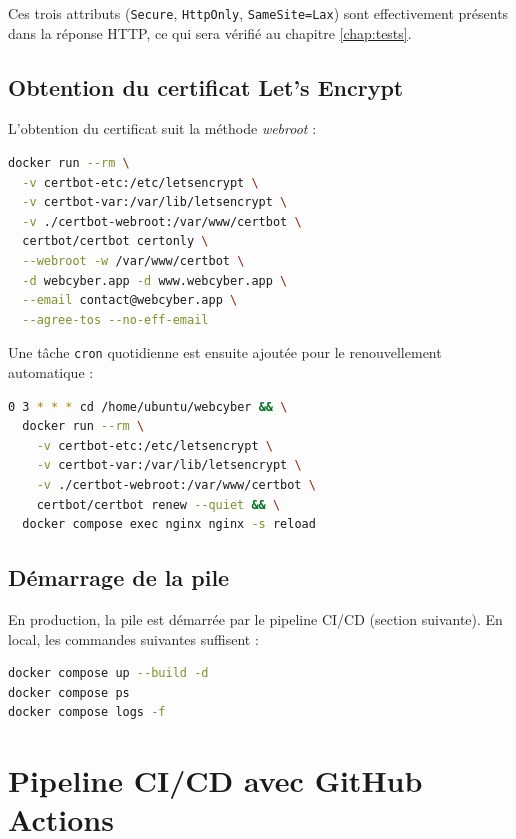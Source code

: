 Ces trois attributs (\texttt{Secure}, \texttt{HttpOnly},
\texttt{SameSite=Lax}) sont effectivement présents dans la réponse
HTTP, ce qui sera vérifié au chapitre \ref{chap:tests}.

\subsection{Obtention du certificat Let's Encrypt}

L'obtention du certificat suit la méthode \emph{webroot} :

\begin{lstlisting}[language=bash, caption={Première émission du certificat via Certbot.}]
docker run --rm \
  -v certbot-etc:/etc/letsencrypt \
  -v certbot-var:/var/lib/letsencrypt \
  -v ./certbot-webroot:/var/www/certbot \
  certbot/certbot certonly \
  --webroot -w /var/www/certbot \
  -d webcyber.app -d www.webcyber.app \
  --email contact@webcyber.app \
  --agree-tos --no-eff-email
\end{lstlisting}

Une tâche \texttt{cron} quotidienne est ensuite ajoutée pour le
renouvellement automatique :

\begin{lstlisting}[language=bash, caption={Renouvellement automatique des certificats.}]
0 3 * * * cd /home/ubuntu/webcyber && \
  docker run --rm \
    -v certbot-etc:/etc/letsencrypt \
    -v certbot-var:/var/lib/letsencrypt \
    -v ./certbot-webroot:/var/www/certbot \
    certbot/certbot renew --quiet && \
  docker compose exec nginx nginx -s reload
\end{lstlisting}

\subsection{Démarrage de la pile}

En production, la pile est démarrée par le pipeline CI/CD (section
suivante). En local, les commandes suivantes suffisent :

\begin{lstlisting}[language=bash, caption={Démarrage et vérification.}]
docker compose up --build -d
docker compose ps
docker compose logs -f
\end{lstlisting}

\section{Pipeline CI/CD avec GitHub Actions}
\label{sec:cicd}

